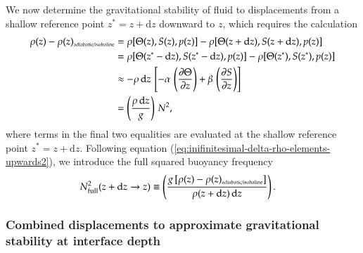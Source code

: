 We now determine the gravitational stability of fluid to displacements
from a shallow reference point $z^{*} = z + \mathrm{d}z$ downward to
$z$, which requires the calculation
\begin{equation}
\begin{split}
\rho(z)  - \rho(z)_{\mbox{\tiny adiabatic/isohaline}}  
&= 
 \rho[ \Theta(z), S(z), p(z)]
-
\rho[ \Theta(z+\mathrm{d}z), S(z+\mathrm{d}z), p(z)]
\\
 &=
 \rho[ \Theta(z^{*}-\mathrm{d}z), S(z^{*}-\mathrm{d}z), p(z)]
-
\rho[ \Theta(z^{*}), S(z^{*}), p(z)]
\\
&\approx 
 -\rho \, \mathrm{d}z \, \left[ 
   -\alpha \, \left( \frac{\partial \Theta}{\partial z} \right )
  + \beta \, \left( \frac{\partial S}{\partial z} \right) \right]
 \\
&=
\left( \frac{\rho \, \mathrm{d}z}{g} \right) \, N^{2},
\end{split}
\label{eq:inifinitesimal-delta-rho-elements-downward}
\end{equation}
where terms in the final two equalities are evaluated at the shallow
reference point $z^{*} = z + \mathrm{d}z$.  Following equation
(\ref{eq:inifinitesimal-delta-rho-elements-upwards2}), we introduce the
full squared buoyancy frequency
\begin{equation}
\begin{split}
 N^{2}_{\mbox{\scriptsize full}}(z +\mathrm{d}z \rightarrow z) &\equiv 
 \left( \frac{g \, [ \rho(z)  - \rho(z)_{\mbox{\tiny adiabatic/isohaline}} ] } {\rho(z+\mathrm{d}z) \, \mathrm{d}z} \right).
\end{split}
\label{eq:inifinitesimal-delta-rho-elements-downwards}
\end{equation}



\subsubsection{Combined displacements to approximate gravitational stability at
  interface depth}

